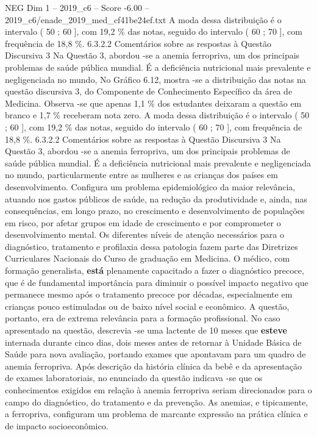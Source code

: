 \begin{textsample}{NEG Dim 1 – 2019\_c6 – Score -6.00 – 2019\_c6/enade\_2019\_med\_cf41be24ef.txt}
A moda dessa distribuição é o intervalo ( 50 ; 60 ], com 19,2 \% das notas, seguido do intervalo ( 60 ; 70 ], com frequência de 18,8 \%. 6.3.2.2 Comentários sobre as respostas à Questão Discursiva 3 Na Questão 3, abordou -se a anemia ferropriva, um dos principais problemas de saúde pública mundial.
É a deficiência nutricional mais prevalente e negligenciada no mundo, No Gráfico 6.12, mostra -se a distribuição das notas na questão discursiva 3, do Componente de Conhecimento Específico da área de Medicina.
Observa -se que apenas 1,1 \% dos estudantes deixaram a questão em branco e 1,7 \% receberam nota zero.
A moda dessa distribuição é o intervalo ( 50 ; 60 ], com 19,2 \% das notas, seguido do intervalo ( 60 ; 70 ], com frequência de 18,8 \%. 6.3.2.2 Comentários sobre as respostas à Questão Discursiva 3 Na Questão 3, abordou -se a anemia ferropriva, um dos principais problemas de saúde pública mundial.
É a deficiência nutricional mais prevalente e negligenciada no mundo, particularmente entre as mulheres e as crianças dos países em desenvolvimento.
Configura um problema epidemiológico da maior relevância, atuando nos gastos públicos de saúde, na redução da produtividade e, ainda, nas consequências, em longo prazo, no crescimento e desenvolvimento de populações em risco, por afetar grupos em idade de crescimento e por comprometer o desenvolvimento mental.
Os diferentes níveis de atenção necessários para o diagnóstico, tratamento e profilaxia dessa patologia fazem parte das Diretrizes Curriculares Nacionais do Curso de graduação em Medicina.
O médico, com formação generalista, \textbf{está} plenamente capacitado a fazer o diagnóstico precoce, que é de fundamental importância para diminuir o possível impacto negativo que permanece mesmo após o tratamento precoce por décadas, especialmente em crianças pouco estimuladas ou de baixo nível social e econômico.
A questão, portanto, era de extrema relevância para a formação profissional.
No caso apresentado na questão, descrevia -se uma lactente de 10 meses que \textbf{esteve} internada durante cinco dias, dois meses antes de retornar à Unidade Básica de Saúde para nova avaliação, portando exames que apontavam para um quadro de anemia ferropriva.
Após descrição da história clínica da bebê e da apresentação de exames laboratoriais, no enunciado da questão indicava -se que os conhecimentos exigidos em relação à anemia ferropriva seriam direcionados para o campo do diagnóstico, do tratamento e da prevenção.
As anemias, e tipicamente, a ferropriva, configuram um problema de marcante expressão na prática clínica e de impacto socioeconômico.

\end{textsample}
